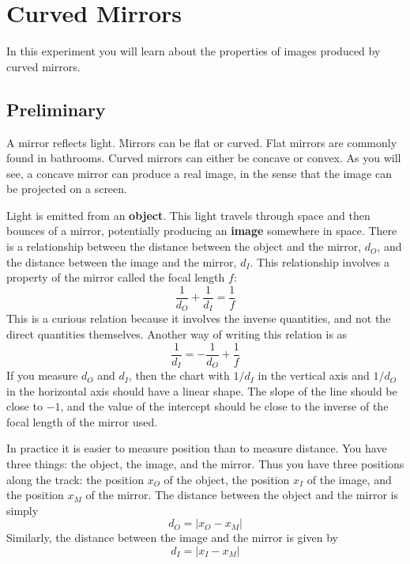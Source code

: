 \setcounter{chapter}{6}
\chapter{Curved Mirrors}
%
In this experiment you will learn about the properties of images produced by curved mirrors.
%
\section{Preliminary}
%
A mirror reflects light. Mirrors can be flat or curved. Flat mirrors are commonly found in bathrooms. Curved mirrors can either be concave or convex. As you will see, a concave mirror can produce a real image, in the sense that the image can be projected on a screen.

Light is emitted from an \textbf{object}. This light travels through space and then bounces of a mirror, potentially producing an \textbf{image} somewhere in space. There is a relationship between the distance between the object and the mirror, $d_{O}$, and the distance between the image and the mirror, $d_{I}$. This relationship involves a property of the mirror called the focal length $f$:
\begin{equation}
    \frac{1}{d_{O}} + \frac{1}{d_{I}} = \frac{1}{f}
\end{equation}
This is a curious relation because it involves the inverse quantities, and not the direct quantities themselves. Another way of writing this relation is as
\begin{equation}
    \frac{1}{d_{I}} = -\frac{1}{d_{O}} + \frac{1}{f}
\end{equation}
If you measure $d_{O}$ and $d_{I}$, then the chart with $1/d_{I}$ in the vertical axis and $1/d_{O}$ in the horizontal axis should have a linear shape. The slope of the line should be close to $-1$, and the value of the intercept should be close to the inverse of the focal length of the mirror used.

In practice it is easier to measure position than to measure distance. You have three things: the object, the image, and the mirror. Thus you have three positions along the track: the position $x_{O}$ of the object, the position $x_{I}$ of the image, and the position $x_{M}$ of the mirror. The distance between the object and the mirror is simply
\begin{equation}
    d_{O} = \left\vert x_{O} - x_{M} \right\vert
\end{equation}
Similarly, the distance between the image and the mirror is given by
\begin{equation}
    d_{I} = \left\vert x_{I} - x_{M} \right\vert
\end{equation}
%
